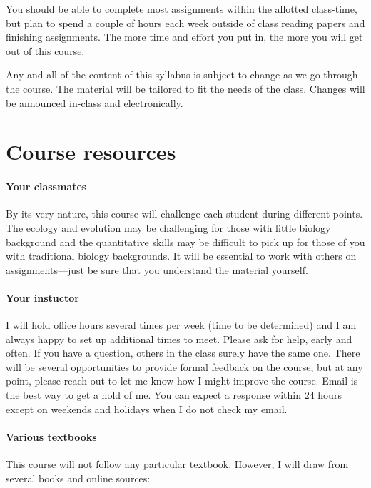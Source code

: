 \documentclass[12pt,]{article}
\let\oldparagraph\paragraph
\renewcommand{\paragraph}[1]{\oldparagraph{#1}\mbox{}}
\begin{document}
You should be able to complete most assignments within the allotted
class-time, but plan to spend a couple of hours each week outside of
class reading papers and finishing assignments. The more time and effort
you put in, the more you will get out of this course.

Any and all of the content of this syllabus is subject to change as we
go through the course. The material will be tailored to fit the needs of
the class. Changes will be announced in-class and electronically.

\section{Course resources}\label{course-resources}

\paragraph{Your classmates}\label{your-classmates}

By its very nature, this course will challenge each student during
different points. The ecology and evolution may be challenging for those
with little biology background and the quantitative skills may be
difficult to pick up for those of you with traditional biology
backgrounds. It will be essential to work with others on
assignments---just be sure that you understand the material yourself.

\paragraph{Your instuctor}\label{your-instuctor}

I will hold office hours several times per week (time to be determined)
and I am always happy to set up additional times to meet. Please ask for
help, early and often. If you have a question, others in the class
surely have the same one. There will be several opportunities to provide
formal feedback on the course, but at any point, please reach out to let
me know how I might improve the course. Email is the best way to get a
hold of me. You can expect a response within 24 hours except on weekends
and holidays when I do not check my email.

\paragraph{Various textbooks}\label{various-textbooks}

This course will not follow any particular textbook. However, I will
draw from several books and online sources:
\end{document}
